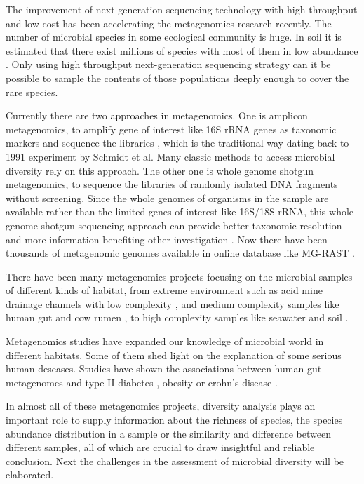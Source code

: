 The improvement of next generation sequencing technology with high throughput and low cost has been accelerating
the metagenomics research recently. The number of microbial species in some ecological community is huge. 
In soil it is estimated that there exist millions of species with most of them in low abundance \cite{Gans:2005aa}. 
Only using high throughput next-generation sequencing strategy can it be possible to sample the contents of those populations deeply enough
to cover the rare species.

Currently there are two approaches in metagenomics. One is amplicon metagenomics, to amplify gene of interest like 
16S rRNA genes as taxonomic markers
and sequence the libraries \cite{Sogin:2006aa}, which is the traditional way dating back to 1991 experiment by Schmidt et al. Many classic 
methods to access microbial diversity rely on this approach. The other one is whole genome shotgun metagenomics, to sequence
the libraries of randomly isolated DNA fragments without screening. Since the whole genomes of organisms in the sample are available rather than the limited
 genes of interest like 16S/18S rRNA, this whole genome shotgun sequencing approach can provide better taxonomic resolution and
 more information benefiting other investigation \cite{Tyson:2004aa} \cite{Qin:2010aa}.  Now there have been thousands of metagenomic genomes available
in online database like MG-RAST \cite{Glass:2010aa}.
 
There have been many metagenomics projects focusing on the microbial samples of different kinds of 
habitat, from extreme environment such as acid mine drainage channels with low complexity \cite{Tyson:2004aa}, and medium complexity
 samples like human gut \cite{Qin:2010aa} and cow rumen \cite{Hess:2011aa}, to high complexity samples like seawater \cite{Venter:2004aa} and 
 soil \cite{Gilbert:2010aa}.
 
Metagenomics studies have expanded our knowledge of microbial world in different habitats.
Some of them shed light on the explanation of some serious human deseases. Studies have shown the associations between
human gut metagenomes and type II diabetes \cite{Qin:2012aa}, obesity \cite{Turnbaugh:2009aa, Kau:2011aa} or crohn's disease \cite{Morgan:2012aa}. 

In almost all of these metagenomics projects, diversity analysis plays an important role to supply information about the 
richness of species, the species abundance distribution in a sample or the similarity and difference between different samples, 
all of which are crucial to draw insightful and reliable conclusion. Next the challenges in the assessment of microbial diversity will 
be elaborated.

